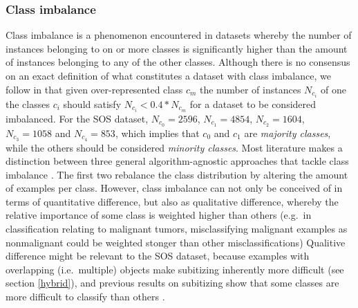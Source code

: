\documentclass[twocolumn]{article}
\begin{document}
\hypertarget{imbalance}{
\subsubsection{Class imbalance}\label{imbalance}}

Class imbalance is a phenomenon encountered in datasets whereby the
number of instances belonging to on or more classes is significantly
higher than the amount of instances belonging to any of the other
classes. Although there is no consensus on an exact definition of what
constitutes a dataset with class imbalance, we follow
\citet{fernandez2013} in that given over-represented class \(c_m\) the
number of instances \(N_{c_i}\) of one the classes \(c_i\) should
satisfy \(N_{c_i} < 0.4 * N_{c_m}\) for a dataset to be considered
imbalanced. For the SOS dataset, \(N_{c_0} = 2596\), \(N_{c_1} = 4854\),
\(N_{c_2} = 1604\), \(N_{c_3} = 1058\) and \(N_{c_4} = 853\), which
implies that \(c_0\) and \(c_1\) are \emph{majority classes}, while the
others should be considered \emph{minority classes}. Most literature
makes a distinction between three general algorithm-agnostic approaches
that tackle class imbalance \citep[for a discussion,
see][]{fernandez2013}. The first two rebalance the class distribution by
altering the amount of examples per class. However, class imbalance can
not only be conceived of in terms of quantitative difference, but also
as qualitative difference, whereby the relative importance of some class
is weighted higher than others (e.g.~in classification relating to
malignant tumors, misclassifying malignant examples as nonmalignant
could be weighted stonger than other misclassifications) Qualitive
difference might be relevant to the SOS dataset, because examples with
overlapping (i.e.~multiple) objects make subitizing inherently more
difficult (see section \ref{hybrid}), and previous results on
subitizing show that some classes are more difficult to classify than
others \citep{zhang2016salient}.
\end{document}
